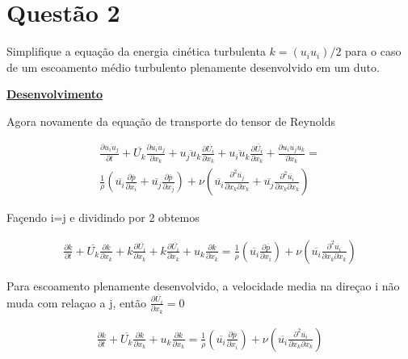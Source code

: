 \documentclass[12pt]{article}
\begin{document}
\section*{Questão 2}

Simplifique a equação da energia cinética turbulenta $k = (u_i u_i)/2$ para o caso de um
escoamento médio turbulento plenamente desenvolvido em um duto.


\textbf{\underline{Desenvolvimento}}

Agora novamente da equação de transporte do tensor de Reynolds

\begin{equation}
	\begin{split}
		\frac{\partial \overline{u_i u_j}}{\partial t} 		
		+ \overline{U_k} \frac{\partial \overline{u_i u_j}}{\partial x_k} + \overline{u_j u_k} \frac{\partial \overline{U_i}}{\partial x_k} + \overline{u_i u_k} \frac{\partial \overline{U_i}}{\partial x_k} + \frac{\partial \overline{u_i u_j u_k}}{\partial x_k}		
		= \\
		\frac{1}{\rho} \left( \overline{u_i}\frac{\partial \overline{p}}{\partial x_i} + \overline{u_j}  \frac{\partial \overline{p}}{\partial x_j} \right) + \nu \left(  \overline{u_i}\frac{\partial ^ 2  \overline{u_j}}{\partial x_k \partial x_k} + \overline
		{u_j}\frac{\partial ^ 2 \overline{u_i}}{\partial x_k \partial x_k}\right) 
	\end{split}
\end{equation}

Façendo i=j e dividindo por 2 obtemos

\begin{equation}
	\begin{split}
		\frac{\partial k}{\partial t} 		
		+ \overline{U_k} \frac{\partial k}{\partial x_k} + k\frac{\partial \overline{U_i}}{\partial x_k} + k\frac{\partial \overline{U_i}}{\partial x_k} + u_k\frac{\partial k}{\partial x_k}		
		= \frac{1}{\rho} \left( \overline{u_i}\frac{\partial \overline{p}}{\partial x_i}  \right) + \nu \left(  \overline{u_i}\frac{\partial ^ 2  \overline{u_i}}{\partial x_k \partial x_k} \right) 
	\end{split}
\end{equation}

Para escoamento plenamente desenvolvido, a velocidade media na direçao i não muda com relaçao a j, então $\frac{\partial \overline{U_i}}{\partial x_k} = 0$

\begin{equation}
	\begin{split}
		\frac{\partial k}{\partial t} 		
		+ \overline{U_k} \frac{\partial k}{\partial x_k} + u_k\frac{\partial k}{\partial x_k}		
		= \frac{1}{\rho} \left( \overline{u_i}\frac{\partial \overline{p}}{\partial x_i}  \right) + \nu \left(  \overline{u_i}\frac{\partial ^ 2  \overline{u_i}}{\partial x_k \partial x_k} \right) 
	\end{split}
\end{equation}
\end{document}

